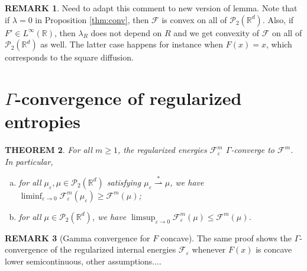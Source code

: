\documentclass[11pt,leqno]{amsart}
\newtheorem{thm}{THEOREM}[section]
\theoremstyle{definition}
\newtheorem{remark}[thm]{REMARK}
\newcommand{\kcomment}[1]{{\color{Aquamarine}#1}} %
\newcommand{\R}{{\mathord{\mathbb R}}}
\newcommand{\Rd}{{\mathord{\mathbb R}^d}}
\newcommand{\wsto}{\stackrel{*}{\rightharpoonup}}
\newcommand{\F}{\mathcal{F}}
\def\P{{\mathcal P}}
\def\e{\varepsilon}
\def\F{\mathcal{F}}
\begin{document}
\begin{remark} \kcomment{Need to adapt this comment to new version of lemma.}
Note that if $\lambda = 0$ in Proposition \ref{thm:conv}, then $\F$ is convex on all of $\P_2(\R^d)$. Also, if $F'\in L^\infty(\R)$, then $\lambda_R$ does not depend on $R$ and we get convexity of $\F$ on all of $\P_2(\R^d)$ as well. The latter case happens for instance when $F(x)=x$, which corresponds to the square diffusion.
\end{remark}



\section{$\Gamma$-convergence of regularized entropies}

\begin{thm} \label{Gamma convergence theorem2}
For all $m \geq 1$, the regularized energies $\F^m_\e$ $\Gamma$-converge to $\F^m$. In particular,
\begin{enumerate}[(a)]
\item for all $\mu_\e, \mu \in \P_2(\Rd)$ satisfying $\mu_\e \wsto \mu$, we have $\liminf_{\e \to 0 } \F^m_\e(\mu_\e) \geq \F^m(\mu)$; \label{liminf condition 2}
\item for all $\mu \in \P_2(\Rd)$, we have $\limsup_{\e \to 0} \F^m_\e(\mu) \leq \F^m(\mu)$. \label{limsup condition 2}
\end{enumerate}
\end{thm}

\begin{remark}[Gamma convergence for $F$ concave]
The same proof shows the $\Gamma$-convergence of the regularized internal energies $\F_\e$ whenever $F(x)$ is concave \kcomment{lower semicontinuous, other assumptions...}.
\end{remark}
\end{document}
